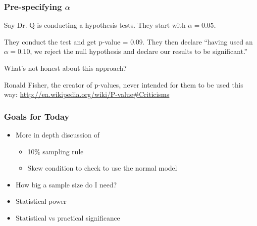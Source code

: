 \documentclass[handout]{beamer}
\newcommand{\blue}[1]{\textcolor{blue2}{#1}}
\begin{document}
\begin{frame}[fragile]
\frametitle{Pre-specifying $\alpha$}

Say Dr. Q is conducting a hypothesis tests.  They start with $\alpha=0.05$.

\pause\vspace{0.5cm}

They conduct the test and get \blue{p-value = 0.09}.  They then declare ``having used an \blue{$\alpha=0.10$}, we reject the null hypothesis and declare our results to be significant.''

\pause\vspace{0.5cm}
What's not honest about this approach?

\pause\vspace{0.5cm}
Ronald Fisher, the creator of p-values, never intended for them to be used this way:  \blue{\href{http://en.wikipedia.org/wiki/P-value\#Criticisms}{http://en.wikipedia.org/wiki/P-value\#Criticisms}}

\end{frame}


\begin{frame}[fragile]
\frametitle{Goals for Today}

\begin{itemize}
\item More in depth discussion of 
\begin{itemize}
\item 10\% sampling rule
\item Skew condition to check to use the normal model
\end{itemize}
\item How big a sample size do I need?
\item Statistical power
\item Statistical vs practical significance
\end{itemize}

\end{frame}
\end{document}
